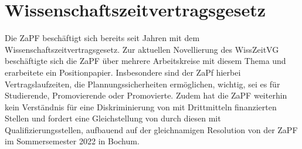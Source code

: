 \documentclass{scrartcl}
\begin{document}
	\section*{Wissenschaftszeitvertragsgesetz}
	
	Die ZaPF beschäftigt sich bereits seit Jahren mit dem Wissenschaftszeitvertragsgesetz. 
	Zur aktuellen Novellierung des WissZeitVG beschäftigte sich die ZaPF über mehrere Arbeitskreise mit diesem Thema und erarbeitete ein Positionpapier. Insbesondere sind der ZaPf hierbei Vertragslaufzeiten, die Plannungssicherheiten ermöglichen, wichtig, sei es für Studierende, Promovierende oder Promovierte.
	Zudem  hat die ZaPF weiterhin kein Verständnis für eine Diskriminierung von mit Drittmitteln finanzierten Stellen und fordert eine Gleichstellung von durch diesen mit Qualifizierungsstellen, aufbauend auf der gleichnamigen Resolution von der ZaPF im Sommersemester 2022 in Bochum.
	
\end{document}
